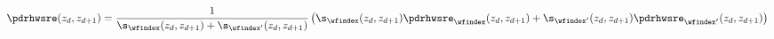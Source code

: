 \begin{equation}
  \pdrhwsre(z_{d}, z_{d + 1}) = 
  \frac {1} {
    \s_{\wfindex}(z_{d}, z_{d + 1}) + 
    \s_{\wfindex'}(z_{d}, z_{d + 1})
  }
  \left(
    \s_{\wfindex}(z_{d}, z_{d + 1}) 
    \pdrhwsre_{\wfindex}(z_{d}, z_{d + 1})
    + 
    \s_{\wfindex'}(z_{d}, z_{d + 1}) 
    \pdrhwsre_{\wfindex'}(z_{d}, z_{d + 1})
  \right)
  \label{eqn:tele-weighted-avg-def}
\end{equation}
